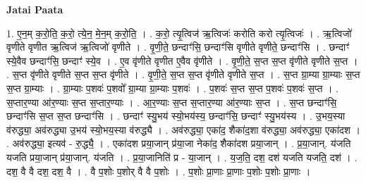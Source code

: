 \documentclass[17pt]{extarticle}
\begin{document}
\textbf{Jatai Paata} \newline

1. ए॒न॒म् क॒रो॒ति॒ क॒रो॒ त्ये॒न॒ मे॒न॒म् क॒रो॒ति॒ । . क॒रो॒ त्यृ॒त्विज॑ ऋ॒त्विजः॑ करोति करो त्यृ॒त्विजः॑ । . ऋ॒त्विजो॑ वृणीते वृणीत ऋ॒त्विज॑ ऋ॒त्विजो॑ वृणीते । . वृ॒णी॒ते॒ छन्दाꣳ॑सि॒ छन्दाꣳ॑सि वृणीते वृणीते॒ छन्दाꣳ॑सि । . छन्दाꣳ॑ स्ये॒वैव छन्दाꣳ॑सि॒ छन्दाꣳ॑ स्ये॒व । . ए॒व वृ॑णीते वृणीत ए॒वैव वृ॑णीते । . वृ॒णी॒ते॒ स॒प्त स॒प्त वृ॑णीते वृणीते स॒प्त । . स॒प्त वृ॑णीते वृणीते स॒प्त स॒प्त वृ॑णीते । . वृ॒णी॒ते॒ स॒प्त स॒प्त वृ॑णीते वृणीते स॒प्त । . स॒प्त ग्रा॒म्या ग्रा॒म्याः स॒प्त स॒प्त ग्रा॒म्याः । . ग्रा॒म्याः प॒शवः॑ प॒शवो᳚ ग्रा॒म्या ग्रा॒म्याः प॒शवः॑ । . प॒शवः॑ स॒प्त स॒प्त प॒शवः॑ प॒शवः॑ स॒प्त । . स॒प्तार॒ण्या आ॑र॒ण्याः स॒प्त स॒प्तार॒ण्याः । . आ॒र॒ण्याः स॒प्त स॒प्तार॒ण्या आ॑र॒ण्याः स॒प्त । . स॒प्त छन्दाꣳ॑सि॒ छन्दाꣳ॑सि स॒प्त स॒प्त छन्दाꣳ॑सि । . छन्दाꣳ॑ स्यु॒भय॑ स्यो॒भय॑स्य॒ छन्दाꣳ॑सि॒ छन्दाꣳ॑ स्यु॒भय॑स्य । . उ॒भय॒स्या व॑रुद्ध्या॒ अव॑रुद्ध्या उ॒भय॑ स्यो॒भय॒स्या व॑रुद्ध्यै । . अव॑रुद्ध्या॒ एका॑द॒ शैका॑द॒शा व॑रुद्ध्या॒ अव॑रुद्ध्या॒ एका॑दश । . अव॑रुद्ध्या॒ इत्यव॑ - रु॒द्ध्यै॒ । . एका॑दश प्रया॒जान् प्र॑या॒जा नेका॑द॒ शैका॑दश प्रया॒जान् । . प्र॒या॒जान्. य॑जति यजति प्रया॒जान् प्र॑या॒जान्. य॑जति । . प्र॒या॒जानिति॑ प्र - या॒जान् । . य॒ज॒ति॒ दश॒ दश॑ यजति यजति॒ दश॑ । . दश॒ वै वै दश॒ दश॒ वै । . वै प॒शोः प॒शोर् वै वै प॒शोः । . प॒शोः प्रा॒णाः प्रा॒णाः प॒शोः प॒शोः प्रा॒णाः । \newline
\end{document}
